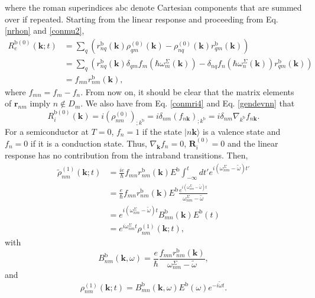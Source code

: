 where the roman superindices $\mathrm{abc}$ denote Cartesian components that are
summed over if repeated. Starting from the linear response and proceeding from
Eq. \eqref{nrhon} and  \eqref{conmu2},
\begin{align}\label{R0e}
R_e^{\mathrm{b}(0)}(\mathbf{k};t)
&=
\sum_{q}
\left(
r^{\mathrm{b}}_{nq}(\mathbf{k})
\rho^{(0)}_{q m}(\mathbf{k})
-
\rho^{(0)}_{nq}(\mathbf{k})
r^{\mathrm{b}}_{q m}(\mathbf{k})
\right)
\nonumber \\
&=
\sum_{q}
\left(
r^{\mathrm{b}}_{nq}(\mathbf{k})
\delta_{q m}f_m(\hbar\omega^\Sigma_m(\mathbf{k}))
-
\delta_{nq}f_n(\hbar\omega^{\Sigma}_{n}(\mathbf{k}))
r^{\mathrm{b}}_{q m}(\mathbf{k})
\right)
\nonumber \\
&= f_{mn}r^{\mathrm{b}}_{nm}(\mathbf{k}),
\end{align}
where $f_{mn} = f_{m}-f_{n}$. From now on, it should be clear that the matrix
elements of $\mathbf{r}_{nm}$ imply $n\notin D_m$. We also have from Eq.
\eqref{conmri4} and Eq. \eqref{gendevnn} that
\begin{equation}\label{R0i}
R_i^{\mathrm{b}(0)}(\mathbf{k})
= i(\rho^{(0)}_{nm})_{;k^{\mathrm{b}}}
= i\delta_{nm}(f_{n\mathbf{k}})_{;k^{\mathrm{b}}}
= i\delta_{nm}\nabla_{k^{\mathrm{b}}} f_{n\mathbf{k}}.
\end{equation}
For a semiconductor at $T = 0$, $f_{n} = 1$ if the state $|n\mathbf{k}\rangle$
is a valence state and $f_{n} = 0$ if it is a conduction state. Thus,
$\nabla_\mathbf{k} f_{n} = 0$, $\mathbf{R}_i^{(0)} = 0$ and the linear response
has no contribution from the intraband transitions. Then,
\begin{align}\label{rtilde2n}
\tilde{\rho}^{(1)}_{nm}(\mathbf{k};t)
&= \frac{ie}{\hbar} f_{mn}
   r^{\mathrm{b}}_{nm}(\mathbf{k})E^{\mathrm{b}}
   \int_{-\infty}^{t} dt'
   e^{i(\omega^\Sigma_{nm}-\tilde{\omega})t'}\nonumber \\
&= \frac{e}{\hbar}
f_{mn}
r^{\mathrm{b}}_{nm}(\mathbf{k})E^{\mathrm{b}}
\frac{e^{i(\omega^\Sigma_{nm}-\tilde{\omega})t}}
{\omega^\Sigma_{nm}-\tilde{\omega}}
\nonumber \\
&=
e^{i(\omega^\Sigma_{nm}-\tilde{\omega})t}
B^{\mathrm{b}}_{mn}(\mathbf{k})E^{\mathrm{b}}(t)
\nonumber \\
&=
e^{i\omega^\Sigma_{nm}t}
\rho^{(1)}_{nm}(\mathbf{k};t)
,
\end{align}
with
\begin{equation}\label{rho1} 
B^{\mathrm{b}}_{nm}(\mathbf{k},\omega)=
\frac{e}{\hbar}
\frac{f_{mn}r^{\mathrm{b}}_{nm}(\mathbf{k})}
     {\omega^\Sigma_{nm}-\tilde{\omega}},
\end{equation} 
and
\begin{equation}\label{rhonoi1}
\rho^{(1)}_{nm}(\mathbf{k};t)
= B^{\mathrm{b}}_{mn}(\mathbf{k},\omega)E^{\mathrm{b}}(\omega)
  e^{-i\tilde{\omega}t}.
\end{equation}

